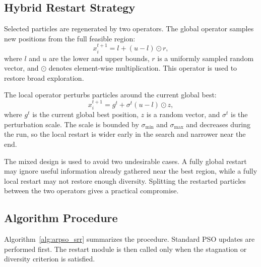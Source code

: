 \documentclass[conference]{IEEEtran}
\begin{document}
\subsection{Hybrid Restart Strategy}
Selected particles are regenerated by two operators. The global operator samples new positions from the full feasible region:
\begin{equation}
    x_i^{t+1}=l+(u-l)\odot r,
    \label{eq:global_restart}
\end{equation}
where $l$ and $u$ are the lower and upper bounds, $r$ is a uniformly sampled random vector, and $\odot$ denotes element-wise multiplication. This operator is used to restore broad exploration.

The local operator perturbs particles around the current global best:
\begin{equation}
    x_i^{t+1}=g^t+\sigma^t (u-l)\odot z,
    \label{eq:local_restart}
\end{equation}
where $g^t$ is the current global best position, $z$ is a random vector, and $\sigma^t$ is the perturbation scale. The scale is bounded by $\sigma_{\min}$ and $\sigma_{\max}$ and decreases during the run, so the local restart is wider early in the search and narrower near the end.

The mixed design is used to avoid two undesirable cases. A fully global restart may ignore useful information already gathered near the best region, while a fully local restart may not restore enough diversity. Splitting the restarted particles between the two operators gives a practical compromise.

\subsection{Algorithm Procedure}
Algorithm~\ref{alg:arpso_srr} summarizes the procedure. Standard PSO updates are performed first. The restart module is then called only when the stagnation or diversity criterion is satisfied.
\end{document}
